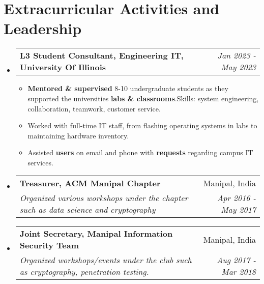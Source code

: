 \documentclass[a4paper,20pt]{article}
\makeatletter
\newcommand{\resumeItemWithoutTitle}[1]{
  \item\small{
    {#1 \vspace{-2pt}}
  }
}
\newcommand{\resumeSubheading}[4]{
  \vspace{-1pt}\item
    \begin{tabular*}{0.97\textwidth}{l@{\extracolsep{\fill}}r}
      \textbf{#1} & #2 \\
      \textit{#3} & \textit{#4} \\
    \end{tabular*}\vspace{-5pt}
}
\newcommand{\resumeSubheadingTwo}[2]{
  \vspace{-1pt}\item
    \begin{tabular*}{0.97\textwidth}{l@{\extracolsep{\fill}}r}
      \textbf{#1} & \textit{#2} \\
    \end{tabular*}
}
\newcommand{\resumeSubHeadingListStart}{\begin{itemize}[leftmargin=*]}
\newcommand{\resumeSubHeadingListEnd}{\end{itemize}}
\newcommand{\resumeItemListStart}{\begin{itemize}}
\newcommand{\resumeItemListEnd}{\end{itemize}\vspace{-5pt}}
\makeatother
\begin{document}
\section{Extracurricular Activities and Leadership}
    \resumeSubHeadingListStart
        \resumeSubheadingTwo{L3 Student Consultant, Engineering IT, University Of Illinois}{Jan 2023 - May 2023}
            \resumeItemListStart
                \vspace{-5pt}
                \resumeItemWithoutTitle{ \textbf{Mentored \& supervised} 8-10 undergraduate students as they supported the universities \textbf{labs \& classrooms}.\newline Skills: system engineering, collaboration, teamwork, customer service.}
                \resumeItemWithoutTitle{Worked with full-time IT staff, from flashing operating systems in labs to maintaining hardware inventory.}
                \resumeItemWithoutTitle{Assisted \textbf{users} on email and phone with \textbf{requests} regarding campus IT services.}
            \resumeItemListEnd
    \resumeSubheading{Treasurer, ACM Manipal Chapter}{Manipal, India}
    {Organized various workshops under the chapter such as data science and cryptography}{Apr 2016 - May 2017}
    \resumeSubheading{Joint Secretary, Manipal Information Security Team}{Manipal, India}
    {Organized workshops/events under the club such as cryptography, penetration testing.}{Aug 2017 - Mar 2018}
    \vspace{2pt}
    \resumeSubHeadingListEnd
\end{document}
